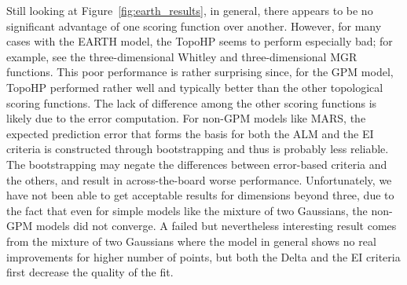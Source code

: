 Still looking at Figure~\ref{fig:earth_results}, in general, there appears to be no significant advantage of one scoring function over another.
However, for many cases with the EARTH model, the TopoHP seems to perform especially bad; for example, see the three-dimensional Whitley and three-dimensional MGR functions.
%
This poor performance is rather surprising since, for the GPM model, TopoHP performed rather well and typically better than the other topological scoring functions.
%
The lack of difference among the other scoring functions is likely due to the error computation.
%
For non-GPM models like MARS, the expected prediction error that forms the basis for both the ALM and the EI criteria is constructed through bootstrapping and thus is probably less reliable.
%
The bootstrapping may negate the differences between error-based criteria and the others, and result in across-the-board worse performance.
%
Unfortunately, we have not been able to get acceptable results for dimensions beyond three, due to the fact that even for simple models like the mixture of two Gaussians, the non-GPM models did not converge.
%
A failed but nevertheless interesting result comes from the mixture of two Gaussians where the model in general shows no real improvements for higher number of points, but both the Delta and the EI criteria first decrease the quality of the fit.

